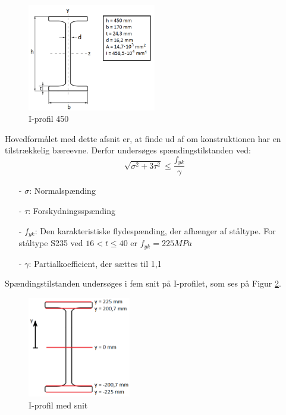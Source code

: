 \begin{figure}[H]
	\centering
	\includegraphics[width=0.5\textwidth]{billeder/iprofil.png}
	\caption{I-profil 450}
	\label{fig:iprofil}
\end{figure}

Hovedformålet med dette afsnit er, at finde ud af om konstruktionen har en tilstrækkelig bæreevne. Derfor undersøges spændingstilstanden ved: 
\begin{equation}
	\sqrt{\sigma^2 + 3\tau^2} \le \frac{f_{yk}}{\gamma}
\end{equation}

\begin{itemize}
	\item[-] $\sigma$: Normalspænding 
	\item[-] $\tau$: Forskydningsspænding
	\item[-] $f_{yk}$: Den karakteristiske flydespænding, der afhænger af ståltype. For ståltype S235 ved $16 < t \le 40$ er $f_{yk} = 225 MPa$ \citep[ s. 213]{stabi}
	\item[-] $\gamma$: Partialkoefficient, der sættes til 1,1 \citep[ s. 212]{stabi}
\end{itemize}

Spændingstilstanden undersøges i fem snit på I-profilet, som ses på Figur \ref{fig:iprofilsnit}.

\begin{figure}[H]
	\centering
	\includegraphics[width=0.4\textwidth]{billeder/iprofilsnit.png}
	\caption{I-profil med snit}
	\label{fig:iprofilsnit}
\end{figure}

